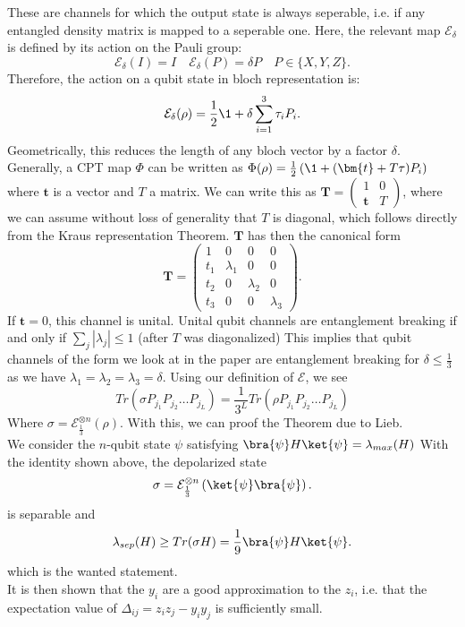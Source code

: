 These are channels for which the output state is always seperable, i.e. if any entangled density matrix is mapped to a seperable one.\cite{horodecki03}
Here, the relevant map $\mathcal{E}_{\delta}$ is defined by its action on the Pauli group: \[
	\mathcal{E}_{\delta}(I)=I\quad\mathcal{E}_{\delta}(P)=\delta P\quad P\in \{X,Y,Z\}
.\]
Therefore, the action on a qubit state in bloch representation is: \[
	\mathcal{E}_{\delta}(\rho) =  \frac{1}{2}\1 + \delta \sum_{i=1}^{3} \tau_i P_i
.\]
Geometrically, this reduces the length of any bloch vector by a factor $\delta$.
Generally, a CPT map $\Phi$ can be written as $\Phi(\rho)=\frac{1}{2}\left( \1 + (\bm{t}+T\tau)P_i \right)$ where $\bm{t}$ is a vector and $T$ a matrix.\cite{ruskai03}
We can write this as $\bm{T}=\begin{pmatrix}
	1 & 0 \\
	\bm{t} & T
\end{pmatrix} $, where we can assume without loss of generality that $T$ is diagonal, which follows directly from the Kraus representation Theorem.
$\bm{T}$ has then the canonical form \[
\bm{T} = \begin{pmatrix}
	1 & 0 & 0 & 0\\
	t_1 & \lambda_1 & 0 & 0\\
	t_2 & 0 & \lambda_2 & 0 \\
	t_3 & 0 & 0 & \lambda_3
\end{pmatrix}
.\]
If $\bm{t}=0$, this channel is unital.
Unital qubit channels are entanglement breaking if and only if $\sum_{j} \left| \lambda_j \right| \le 1$ (after $T$ was diagonalized)\cite{ruskai03}
This implies that qubit channels of the form we look at in the paper are entanglement breaking for $\delta\le \frac{1}{3}$ as we have $\lambda_1=\lambda_2=\lambda_3=\delta$.
Using our definition of $\mathcal{E}$, we see \[
	Tr\left( \sigma P_{j_1}P_{j_2}\ldots P_{j_L} \right) = \frac{1}{3^L}Tr\left( \rho P_{j_1}P_{j_2}\ldots P_{j_L} \right)
\]
Where $\sigma=\mathcal{E}^{\otimes n}_{\frac{1}{3}}(\rho)$.
With this, we can proof the Theorem due to Lieb.\\
We consider the $n$-qubit state $\psi$ satisfying $\bra{\psi}H\ket{\psi}=\lambda_{max}(H)$
With the identity shown above, the depolarized state \[
	\sigma = \mathcal{E}^{\otimes n}_{\frac{1}{3}}\left( \ket{\psi}\bra{\psi} \right)
.\] is separable and \[
\lambda_{sep}(H) \ge Tr(\sigma H)=\frac{1}{9}\bra{\psi}H\ket{\psi}
.\] which is the wanted statement.\\
It is then shown that the $y_i$ are a good approximation to the $z_i$, i.e. that the expectation value of $\Delta_{ij}=z_iz_j-y_iy_j$ is sufficiently small.
